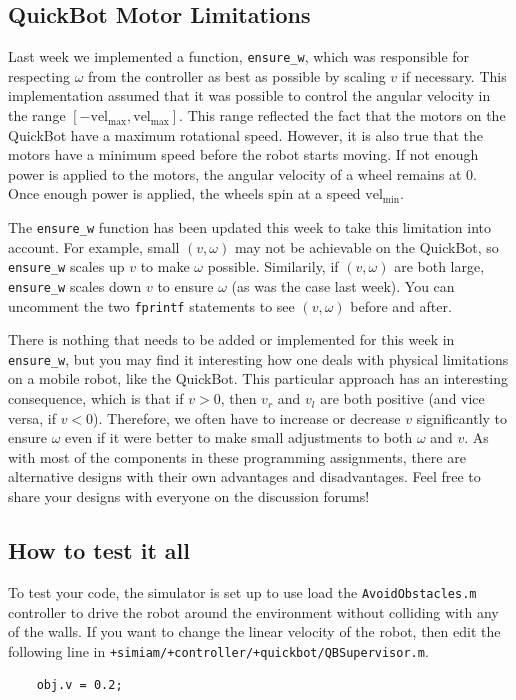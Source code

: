 \documentclass[10pt]{article}
\begin{document}
\subsection*{QuickBot Motor Limitations}

Last week we implemented a function, \texttt{ensure\_w}, which was responsible for respecting $\omega$ from the controller as best as possible by scaling $v$ if necessary. This implementation assumed that it was possible to control the angular velocity in the range $[-\text{vel}_{\max},\text{vel}_{\max}]$. This range reflected the fact that the motors on the QuickBot have a maximum rotational speed. However, it is also true that the motors have a minimum speed before the robot starts moving. If not enough power is applied to the motors, the angular velocity of a wheel remains at $0$. Once enough power is applied, the wheels spin at a speed $\text{vel}_{\min}$.

The \texttt{ensure\_w} function has been updated this week to take this limitation into account. For example, small $(v,\omega)$ may not be achievable on the QuickBot, so \texttt{ensure\_w} scales up $v$ to make $\omega$ possible. Similarily, if $(v,\omega)$ are both large, \texttt{ensure\_w} scales down $v$ to ensure $\omega$ (as was the case last week). You can uncomment the two \texttt{fprintf} statements to see $(v,\omega)$ before and after.

There is nothing that needs to be added or implemented for this week in \texttt{ensure\_w}, but you may find it interesting how one deals with physical limitations on a mobile robot, like the QuickBot. This particular approach has an interesting consequence, which is that if $v>0$, then $v_r$ and $v_l$ are both positive (and vice versa, if $v<0$). Therefore, we often have to increase or decrease $v$ significantly to ensure $\omega$ even if it were better to make small adjustments to both $\omega$ and $v$. As with most of the components in these programming assignments, there are alternative designs with their own advantages and disadvantages. Feel free to share your designs with everyone on the discussion forums!

\subsection*{How to test it all}

To test your code, the simulator is set up to use load the \texttt{AvoidObstacles.m} controller to drive the robot around the environment without colliding with any of the walls. If you want to change the linear velocity of the robot, then edit the following line in \texttt{+simiam/+controller/}\texttt{+quickbot/QBSupervisor.m}.
  \begin{verbatim}
    obj.v = 0.2;\end{verbatim}
\end{document}

